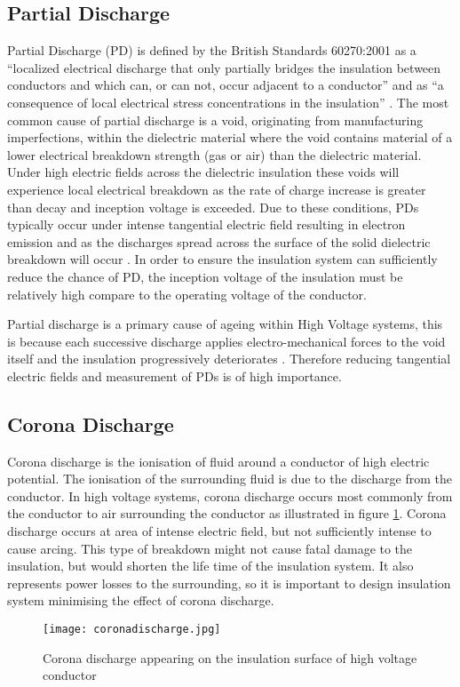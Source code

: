 \subsection{Partial Discharge}
Partial Discharge (PD) is defined by the British Standards 60270:2001 as a “localized electrical discharge that only partially bridges the insulation between conductors and which can, or can not, occur adjacent to a conductor” and as “a consequence of local electrical stress concentrations in the insulation” \cite{60270}. 
The most common cause of partial discharge is a void, originating from manufacturing imperfections, within the dielectric material where the void contains material of a lower electrical breakdown strength (gas or air) than the dielectric material. 
Under high electric fields across the dielectric insulation these voids will experience local electrical breakdown as the rate of charge increase is greater than decay and inception voltage is exceeded. 
Due to these conditions, PDs typically occur under intense tangential electric field resulting in electron emission \cite{surfaceflashover} and as the discharges spread across the surface of the solid dielectric breakdown will occur \cite{kuffel2000high}. In order to ensure the insulation system can sufficiently reduce the chance of PD, the inception voltage of the insulation must be relatively high compare to the operating voltage of the conductor.

Partial discharge is a primary cause of ageing within High Voltage systems, this is because each successive discharge applies electro-mechanical forces to the void itself and the insulation progressively deteriorates \cite{PDageing}. Therefore reducing tangential electric fields and measurement of PDs is of high importance. 

\subsection{Corona Discharge}
Corona discharge is the ionisation of fluid around a conductor of high electric potential. The ionisation of the surrounding fluid is due to the discharge from the conductor. In high voltage systems, corona discharge occurs most commonly from the conductor to air surrounding the conductor as illustrated in figure \ref{figure:corona}. Corona discharge occurs at area of intense electric field, but not sufficiently intense to cause arcing. This type of breakdown might not cause fatal damage to the insulation, but would shorten the life time of the insulation system. It also represents power losses to the surrounding, so it is important to design insulation system minimising the effect of corona discharge.

\begin{figure}[!h]
   \centering
   \texttt{[image: coronadischarge.jpg]}
   \caption{Corona discharge appearing on the insulation surface of high voltage conductor}
   \label{figure:corona}
\end{figure}
